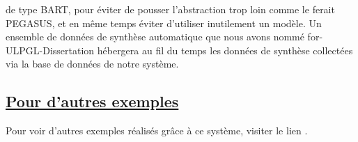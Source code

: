 de type BART, pour éviter de pousser l'abstraction trop loin comme le ferait PEGASUS, et en même temps éviter d'utiliser inutilement un modèle. Un ensemble de données de synthèse automatique que nous avons nommé for-ULPGL-Dissertation hébergera au fil du temps les données de synthèse collectées via la base de données de notre système.
\subsection*{\underline{Pour d'autres exemples}}
Pour voir d'autres exemples réalisés grâce à ce système, visiter le lien \cite{AllResumes}.